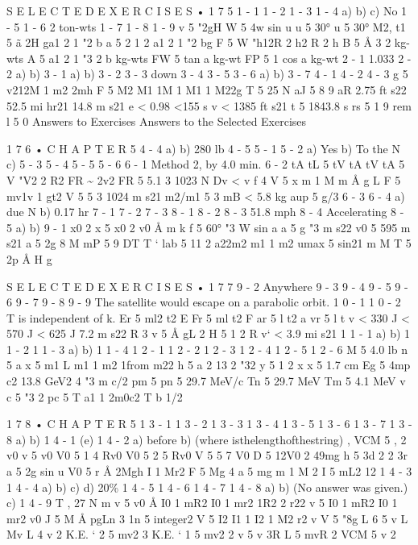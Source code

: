 \documentclass[10pt,oneside]{article}
\begin{document}
S E L E C T E D  E X E R C I S E S • 1 7 5 1 - 1 1 - 2 1 - 3 1 - 4 a) b) c) No 1 - 5 1 - 6 2 ton-wts 1 - 7 1 - 8 1 - 9 v 5 "2gH W 5 4w sin u u 5 30° u 5 30° M2, t1 5 ã 2H ga1 2 1 "2 b a 5 2 1 2 a1 2 1 "2 bg F 5 W "h12R 2 h2 R 2 h B 5 Å 3 2 kg-wts A 5 a1 2 1 "3 2 b kg-wts FW 5 tan a kg-wt FP 5 1 cos a kg-wt 2 - 1 1.033 2 - 2 a) b) 3 - 1 a) b) 3 - 2 3 - 3 down 3 - 4 3 - 5 3 - 6 a) b) 3 - 7 4 - 1 4 - 2 4 - 3 g 5 v212M 1 m2 2mh F 5 M2 M1 1M 1 M1 1 M22g T 5 25 N aJ 5 8 9 aR 2.75 ft s22 52.5 mi hr21 14.8 m s21 e < 0.98 <155 s v < 1385 ft s21 t 5 1843.8 s rs 5 1 9 rem l 5 0 Answers to Exercises Answers to the Selected Exercises\par

1 7 6 • C H A P T E R  5 4 - 4 a) b) 280 lb 4 - 5 5 - 1 5 - 2 a) Yes b) To the N c) 5 - 3 5 - 4 5 - 5 5 - 6 6 - 1 Method 2, by 4.0 min. 6 - 2 tA tL 5 tV tA tV tA 5 V "V2 2 R2 FR \textasciitilde{} 2v2 FR 5 5.1 3 1023 N Dv < v f 4 V 5 x m 1 M m Å g L F 5 mv1v 1 gt2 V 5 5 3 1024 m s21 m2/m1 5 3 mB < 5.8 kg aup 5 g/3 6 - 3 6 - 4 a) due N b) 0.17 hr 7 - 1 7 - 2 7 - 3 8 - 1 8 - 2 8 - 3 51.8 mph 8 - 4 Accelerating 8 - 5 a) b) 9 - 1 x0 2 x 5 x0 2 v0 Å m k f 5 60° "3 W sin a a 5 g "3 m s22 v0 5 595 m s21 a 5 2g 8 M mP 5 9 DT T  ` lab 5 11 2 a22m2 m1 1 m2 umax 5 sin21 m M T 5 2p Å H g\par

S E L E C T E D  E X E R C I S E S • 1 7 7 9 - 2 Anywhere 9 - 3 9 - 4 9 - 5 9 - 6 9 - 7 9 - 8 9 - 9 The satellite would escape on a parabolic orbit. 1 0 - 1 1 0 - 2 T is independent of k. Er 5 ml2 t2 E Fr 5 ml t2 F ar 5 l t2 a vr 5 l t v < 330 J < 570 J < 625 J 7.2 m s22 R 3 v 5 Å gL 2 H 5 1 2 R v` < 3.9 mi s21 1 1 - 1 a) b) 1 1 - 2 1 1 - 3 a) b) 1 1 - 4 1 2 - 1 1 2 - 2 1 2 - 3 1 2 - 4 1 2 - 5 1 2 - 6 M 5 4.0 lb n 5 a x 5 m1 L m1 1 m2 1from m22 h 5 a 2 13 2 "32 y 5 1 2 x x 5 1.7 cm Eg 5 4mp c2 13.8 GeV2 4 "3 m c/2 pm 5 pn 5 29.7 MeV/c Tn 5 29.7 MeV Tm 5 4.1 MeV v c 5 "3 2 pc 5 T a1 1 2m0c2 T b 1/2\par

1 7 8 • C H A P T E R  5 1 3 - 1 1 3 - 2 1 3 - 3 1 3 - 4 1 3 - 5 1 3 - 6 1 3 - 7 1 3 - 8 a) b) 1 4 - 1 (e) 1 4 - 2 a) before b) (where isthelengthofthestring) , VCM 5 , 2 v0 v 5 v0 V0 5 1 4 Rv0 V0 5 2 5 Rv0 V 5 5 7 V0 D 5 12V0 2 49mg h 5 3d 2 2 3r a 5 2g sin u V0 5 r Å 2Mgh I 1 Mr2 F 5 Mg 4 a 5 mg m 1 M 2 I 5 mL2 12 1 4 - 3 1 4 - 4 a) b) c) d) 20\% 1 4 - 5 1 4 - 6 1 4 - 7 1 4 - 8 a) b) (No answer was given.) c) 1 4 - 9 T , 27 N m v 5 v0 Å I0 1 mR2 I0 1 mr2 1R2 2 r22 v 5 I0 1 mR2 I0 1 mr2 v0 J 5 M Å pgLn 3  1n 5 integer2 V 5 I2 I1 1 I2 1 M2 r2 v V 5 "8g L 6 5 v L Mv L 4 v 2 K.E. ` 2 5 mv2 3 K.E. ` 1 5 mv2 2 v 5 v 3R L 5 mvR 2 VCM 5 v 2\par
\end{document}
